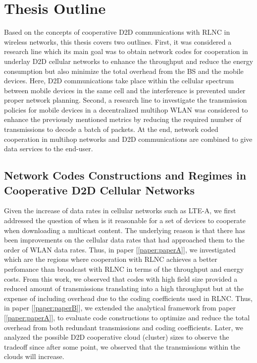 \section{Thesis Outline}\label{sec:intro_thesis_outline}

Based on the concepts of cooperative \ac{D2D} communications with \ac{RLNC} in wireless networks, this thesis covers two outlines. First, it was considered a research line which its main goal was to obtain network codes for cooperation in underlay \ac{D2D} cellular networks to enhance the throughput and reduce the energy consumption but also minimize the total overhead from the \ac{BS} and the mobile devices. Here, \ac{D2D} communications take place within the cellular spectrum between mobile devices in the same cell and the interference is prevented under proper network planning. Second, a research line to investigate the transmission policies for mobile devices in a decentralized multihop \ac{WLAN} was considered to enhance the previously mentioned metrics by reducing the required number of transmissions to decode a batch of packets. At the end, network coded cooperation in multihop networks and \ac{D2D} communications are combined to give data services to the end-user.

\subsection{Network Codes Constructions and Regimes in Cooperative D2D Cellular Networks}

Given the increase of data rates in cellular networks such as \ac{LTE-A}, we first addressed the question of when is it reasonable for a set of devices to cooperate when downloading a multicast content. The underlying reason is that there has been improvements on the cellular data rates that had approached them to the order of \ac{WLAN} data rates. Thus, in paper {[\ref{paper:paperA}]}, we investigated which are the regions where cooperation with \ac{RLNC} achieves a better perfomance than broadcast with \ac{RLNC} in terms of the throughput and energy costs. From this work, we observed that codes with high field size provided a reduced amount of transmissions translating into a high throughput but at the expense of including overhead due to the coding coefficients used in \ac{RLNC}. Thus, in paper {[\ref{paper:paperB}]}, we extended the analytical framework from paper {[\ref{paper:paperA}]}, to evaluate code constructions to optimize and reduce the total overhead from both redundant transmissions and coding coefficients. Later, we analyzed the possible \ac{D2D} cooperative cloud (cluster) sizes to observe the tradeoff since after some point, we observed that the transmissions within the clouds will increase.

